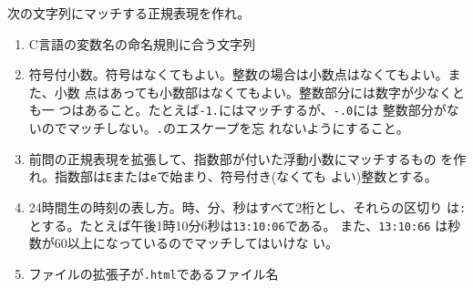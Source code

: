 \begin{Prob}\upshape\Must
次の文字列にマッチする正規表現を作れ。
\begin{enumerate}
 \item C言語の変数名の命名規則に合う文字列\ifText\\[0.05\textheight]\fi
 \item 符号付小数。符号はなくてもよい。整数の場合は小数点はなくてもよい。また、小数
       点はあっても小数部はなくてもよい。整数部分には数字が少なくとも一
       つはあること。たとえば\Verb+-1.+にはマッチするが、\Verb+-.0+には
       整数部分がないのでマッチしない。\Verb+.+のエスケープを忘
       れないようにすること。\ifText\\[0.05\textheight]\fi
 \item 前問の正規表現を拡張して、指数部が付いた浮動小数にマッチするもの
       を作れ。指数部は\Verb+E+または\Verb+e+で始まり、符号付き(なくても
       よい)整数とする。\ifText\\[0.05\textheight]\fi
 \item 24時間生の時刻の表し方。時、分、秒はすべて2桁とし、それらの区切り
       は\Verb+:+とする。たとえば午後1時10分6秒は\Verb+13:10:06+である。
  また、\Verb+13:10:66+ は秒数が60以上になっているのでマッチしてはいけな
       い。
       \ifText\\[0.05\textheight]\fi
 \item ファイルの拡張子が\texttt{.html}であるファイル名\ifText\\[0.05\textheight]\fi
\end{enumerate}
\end{Prob}
